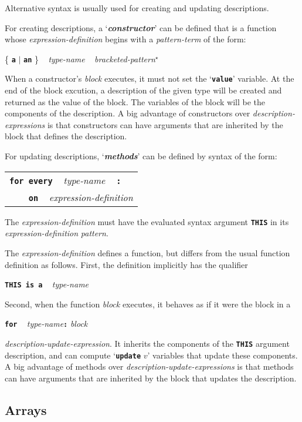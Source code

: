 \documentclass[12pt]{article}
\newcommand{\TT}[1]{{\tt \bfseries #1}}
\newcommand{\key}[1]{{\bf \em #1}\index{#1}}
\newcommand{\skey}[2]{{\bf \em #1#2}\index{#1}}
\newcommand{\EOL}{\penalty \exhyphenpenalty}
\newcommand{\STAR}{{\Large $^\star$}}
\begin{document}
Alternative syntax is usually used for creating and updating descriptions.

For creating descriptions, a `\key{constructor}' can be defined that
is a function whose {\em expression-definition} begins with a
{\em pattern-term} of the form:
\begin{center}
\{ \TT{a} $|$ \TT{an} \} ~ {\em type-name} ~ {\em bracketed-pattern}\STAR{}
\end{center}

When a constructor's {\em block} executes, it must not set the
`\TT{value}' variable.  At the end of the block excution, a description
of the given type will be created and returned as the value of the
block.  The variables of the block will be the components of the
description.  A big advantage of constructors over {\em description-expressions}
is that constructors can have arguments that are inherited by the block
that defines the description.

For updating descriptions, `\skey{method}s' can be defined by syntax
of the form:
\begin{center}
\begin{tabular}{l}
\TT{for every} ~ {\em type-name} ~ \TT{:} \\
\verb|    |\TT{on} ~ {\em expression-definition}
\end{tabular}
\end{center}

The {\em expression-definition} must have the evaluated syntax argument
\TT{THIS} in its {\em expression-\EOL de\-fi\-ni\-tion} {\em pattern}.  

The {\em expression-definition} defines a function, but differs from
the usual function definition as follows.  First, the definition
implicitly has the qualifier
\begin{center}
\TT{THIS is a} ~ {\em type-name}
\end{center}
Second, when the function {\em block} executes, it behaves as if it
were the block in a
\begin{center}
\TT{for} ~ {\em type-name}\TT{:} {\em block}
\end{center}
{\em description-update-expression}.  It inherits the components of
the \TT{THIS} argument description, and can compute `\TT{update} $v$'
variables that update these components.  A big advantage of
methods over {\em description-update-expressions} is that methods
can have arguments that are inherited by the block that updates
the description.

\subsection{Arrays}
\label{Arrays}
\end{document}
